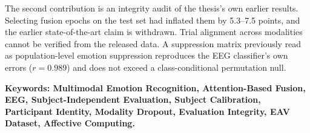 The second contribution is an integrity audit of the thesis's own earlier results. Selecting fusion epochs on the test set had inflated them by 5.3--7.5 points, and the earlier state-of-the-art claim is withdrawn. Trial alignment across modalities cannot be verified from the released data. A suppression matrix previously read as population-level emotion suppression reproduces the EEG classifier's own errors ($r = 0.989$) and does not exceed a class-conditional permutation null.

\vspace{1cm}
\textbf{Keywords: Multimodal Emotion Recognition, Attention-Based Fusion, EEG, Subject-Independent Evaluation, Subject Calibration, Participant Identity, Modality Dropout, Evaluation Integrity, EAV Dataset, Affective Computing.}
\pagebreak
